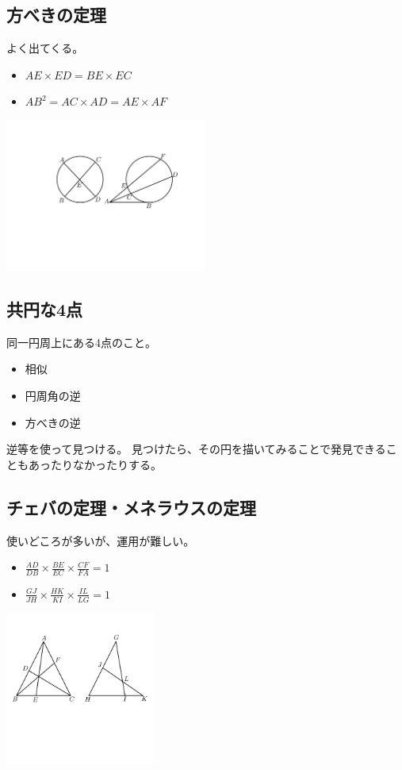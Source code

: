 \documentclass[uplatex,fleqn]{jsbook}
\begin{document}
\subsection{方べきの定理}
よく出てくる。
\begin{itemize}
    \item $AE\times ED=BE\times EC$
    \item $AB^2=AC\times AD = AE \times AF$
\end{itemize}

\includegraphics[clip,height=5cm]{figures/houbeki.pdf}

\subsection{共円な4点}
同一円周上にある4点のこと。
\begin{itemize}
    \item 相似
    \item 円周角の逆
    \item 方べきの逆
\end{itemize}
逆等を使って見つける。
見つけたら、その円を描いてみることで発見できることもあったりなかったりする。

\subsection{チェバの定理・メネラウスの定理}
使いどころが多いが、運用が難しい。
\begin{itemize}
    \item $\displaystyle \frac{AD}{DB} \times \frac{BE}{EC} \times \frac{CF}{FA} = 1$
    \item $\displaystyle \frac{GJ}{JH} \times \frac{HK}{KI} \times \frac{IL}{LG} = 1$
\end{itemize}

\includegraphics[clip,height=5cm]{figures/Ceva_Menelaus.pdf}
\end{document}
